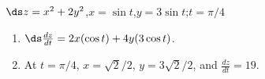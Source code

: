 {$\ds z=x^2+2y^2$,\qquad $x=\sin t$,\qquad $y=3\sin t$;\qquad $t=\pi/4$\label{12_08_ex_10}}
{\begin{enumerate}
	\item $\ds\frac{dz}{dt} = 2x(\cos t) + 4y(3\cos t)$.
	\item At $t=\pi/4$, $x=\sqrt{2}/2$, $y=3\sqrt{2}/2$, and $\frac{dz}{dt} = 19$.
\end{enumerate}}
